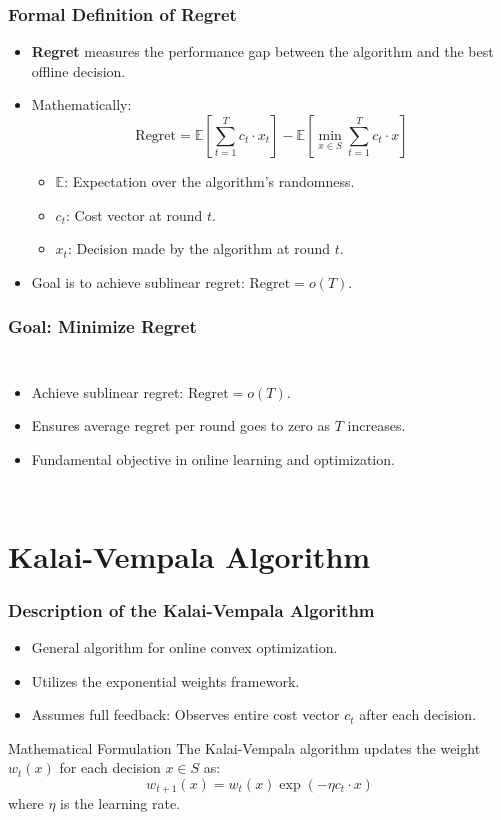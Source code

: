 \documentclass{beamer}
\begin{document}
\begin{frame}
\frametitle{Formal Definition of Regret}
\begin{itemize}
    \item \textbf{Regret} measures the performance gap between the algorithm and the best offline decision.
    \item Mathematically: 
    \[
    \text{Regret} = \mathbb{E}\left[\sum_{t=1}^T c_t \cdot x_t \right] - \mathbb{E}\left[\min_{x \in S} \sum_{t=1}^T c_t \cdot x \right]
    \]
    \begin{itemize}
        \item \( \mathbb{E} \): Expectation over the algorithm's randomness.
        \item \( c_t \): Cost vector at round \( t \).
        \item \( x_t \): Decision made by the algorithm at round \( t \).
    \end{itemize}
    \item Goal is to achieve sublinear regret: \( \text{Regret} = o(T) \).
\end{itemize}
\end{frame}

\begin{frame}
\frametitle{Goal: Minimize Regret}
\begin{columns}
    \begin{itemize}
        \item Achieve sublinear regret: \( \text{Regret} = o(T) \).
        \item Ensures average regret per round goes to zero as \( T \) increases.
        \item Fundamental objective in online learning and optimization.
    \end{itemize}
\end{columns}
\end{frame}

\section{Kalai-Vempala Algorithm}

\begin{frame}
\frametitle{Description of the Kalai-Vempala Algorithm}
\begin{itemize}
    \item General algorithm for online convex optimization.
    \item Utilizes the exponential weights framework.
    \item Assumes full feedback: Observes entire cost vector \( c_t \) after each decision.
\end{itemize}
\begin{exampleblock}{Mathematical Formulation}
    The Kalai-Vempala algorithm updates the weight \( w_t(x) \) for each decision \( x \in S \) as:
    \[
    w_{t+1}(x) = w_t(x) \exp\left(-\eta c_t \cdot x \right)
    \]
    where \( \eta \) is the learning rate.
\end{exampleblock}
\end{frame}
\end{document}
